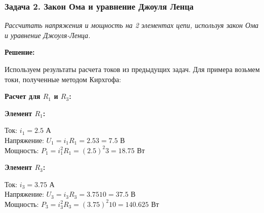 \subsubsection{Задача 2. Закон Ома и уравнение Джоуля Ленца}
\textit{Рассчитать напряжения и мощность на 2 элементах цепи, используя закон Ома и уравнение Джоуля-Ленца.}

\textbf{Решение:}

Используем результаты расчета токов из предыдущих задач. Для примера возьмем токи, полученные методом Кирхгофа:

\textbf{Расчет для $R_1$ и $R_3$:}

\textbf{Элемент $R_1$:}
\begin{flushleft}
Ток: $i_1 = 2.5$ А \\
Напряжение: $U_1 = i_1R_1 = 2.5 3 = 7.5$ В \\
Мощность: $P_1 = i_1^2R_1 = (2.5)^2  3 = 18.75$ Вт
\end{flushleft}

\textbf{Элемент $R_3$:}
\begin{flushleft}
Ток: $i_3 = 3.75$ А \\
Напряжение: $U_3 = i_3R_3 = 3.75 10 = 37.5$ В \\
Мощность: $P_3 = i_3^2R_3 = (3.75)^2  10 = 140.625$ Вт
\end{flushleft}

